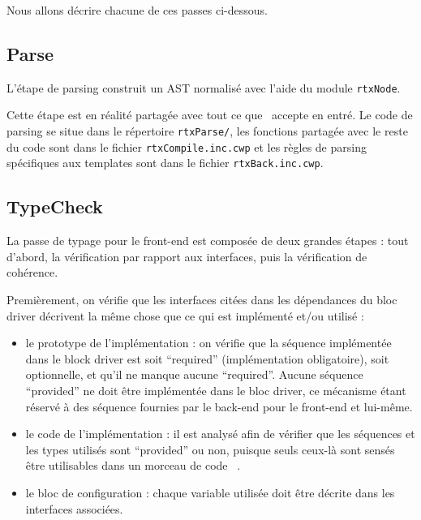 \documentclass[french]{rtxreport}
\begin{document}
Nous allons décrire chacune de ces passes ci-dessous.

\subsection{Parse}

L'étape de parsing construit un AST normalisé avec l'aide du module
\texttt{rtxNode}.

Cette étape est en réalité partagée avec tout ce que \rtx\ accepte en entré. Le
code de parsing se situe dans le répertoire \texttt{rtxParse/}, les fonctions
partagée avec le reste du code sont dans le fichier \texttt{rtxCompile.inc.cwp}
et les règles de parsing spécifiques aux templates sont dans le fichier
\texttt{rtxBack.inc.cwp}.

\subsection{TypeCheck}

La passe de typage pour le front-end est composée de deux grandes étapes :
tout d'abord, la vérification par rapport aux interfaces, puis la vérification
de cohérence.

Premièrement, on vérifie que les interfaces citées dans les dépendances du
bloc driver décrivent la même chose que ce qui est implémenté et/ou utilisé :
\begin{itemize}

    \item le prototype de l'implémentation : on vérifie que la séquence
        implémentée dans le block driver est soit ``required'' (implémentation
        obligatoire), soit optionnelle, et qu'il ne manque aucune ``required''.
        Aucune séquence ``provided'' ne doit être implémentée dans le bloc
        driver, ce mécanisme étant réservé à des séquence fournies par le
        back-end pour le front-end et lui-même.

    \item le code de l'implémentation : il est analysé afin de vérifier que les
        séquences et les types utilisés sont ``provided'' ou non, puisque seuls
        ceux-là sont sensés être utilisables dans un morceau de code \rtx\ .

    \item le bloc de configuration : chaque variable utilisée doit être décrite
        dans les interfaces associées.

\end{itemize}
\end{document}
